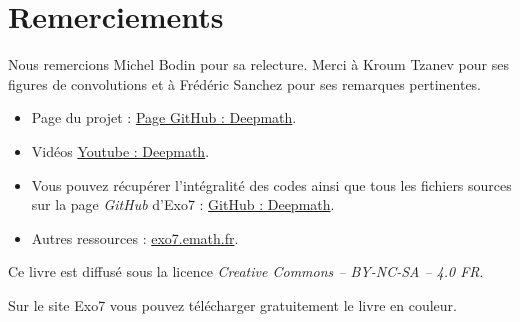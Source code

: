 
\clearemptydoublepage
\pagestyle{empty}\thispagestyle{empty}

\vspace*{\fill}

\section*{Remerciements}


Nous remercions Michel Bodin pour sa relecture.
Merci à Kroum Tzanev pour ses figures de convolutions et à Frédéric Sanchez pour ses remarques pertinentes.

\bigskip

\begin{itemize}

  \item Page du projet : \href{https://exo7math.github.io/deepmath-exo7/}{\og{}Page GitHub : Deepmath\fg{}}.

  \item Vidéos \href{https://www.youtube.com/channel/UCnKarYaG1VuzdWix1vBitFg/}{\og{}Youtube : Deepmath\fg{}}.

  \item Vous pouvez récupérer l'intégralité des codes \Python{} ainsi que tous les fichiers sources sur la page \emph{GitHub} d'Exo7 :
\href{https://github.com/exo7math/deepmath-exo7}{\og{}GitHub : Deepmath\fg{}}.
  
  \item Autres ressources : \href{http://exo7.emath.fr/}{exo7.emath.fr}.
\end{itemize}




\vspace*{\fill}

\bigskip 

\begin{center}
\end{center}



\begin{center}
Ce livre est diffusé sous la licence \emph{Creative Commons -- BY-NC-SA -- 4.0 FR}.

Sur le site Exo7 vous pouvez télécharger gratuitement le livre en couleur.
\end{center}




\printindex
{}

